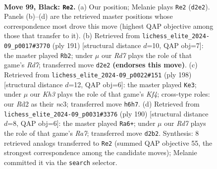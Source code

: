 \documentclass[11pt]{article}
\begin{document}
\clearpage

\begin{figure}[p]\centering
\begin{subfigure}{0.46\textwidth}\centering
\resizebox{\linewidth}{!}{%
\newchessgame
\chessboard[
  setfen={2R5/6p1/5p1k/7p/1N5P/6PK/3r4/8 b - - 23 99},
  showmover=false,
  pgfstyle=straightmove, color=movearrow, markmove={d2-e2}
]}
\caption{}
\end{subfigure}\hfill
\begin{subfigure}{0.46\textwidth}\centering
\resizebox{\linewidth}{!}{%
\newchessgame
\chessboard[
  setfen={8/R7/6pk/7p/7P/6PK/3r4/8 b - - 29 96},
  showmover=false,
  pgfstyle=straightmove, color=movearrow, markmove={d2-b2}
]}
\caption{}
\end{subfigure}
\\[4pt]
\begin{subfigure}{0.46\textwidth}\centering
\resizebox{\linewidth}{!}{%
\newchessgame
\chessboard[
  setfen={8/5k2/6p1/4P2p/3N1K1P/2n3P1/8/8 w - - 7 100},
  showmover=false,
  pgfstyle=straightmove, color=movearrow, markmove={f4-e3}
]}
\caption{}
\end{subfigure}\hfill
\begin{subfigure}{0.46\textwidth}\centering
\resizebox{\linewidth}{!}{%
\newchessgame
\chessboard[
  setfen={8/R7/5k2/4p1p1/4P1P1/5PK1/2r5/8 w - - 87 96},
  showmover=false,
  pgfstyle=straightmove, color=movearrow, markmove={a7-a6}
]}
\caption{}
\end{subfigure}
\caption{\textbf{Move 99, Black: \texttt{Re2}.} (a) Our position; Melanie plays \texttt{Re2} (\texttt{d2e2}). Panels (b)--(d) are the retrieved master positions whose correspondence most drove this move (highest QAP objective among those that transfer to it). (b) Retrieved from \texttt{lichess\_elite\_2024-09\_p0017\#3770} (ply 191) [structural distance $d$=10, QAP obj=7]: the master played \texttt{Rb2}; under $\mu$ our \emph{Rd7} plays the role of that game's \emph{Rd7}; transferred move \texttt{d2e2} \textbf{(endorses this move)}. (c) Retrieved from \texttt{lichess\_elite\_2024-09\_p0022\#151} (ply 198) [structural distance $d$=12, QAP obj=6]: the master played \texttt{Ke3}; under $\mu$ our \emph{Kh3} plays the role of that game's \emph{Kf4}; cross-type roles: our \emph{R}d2 as their \emph{n}c3; transferred move \texttt{h6h7}. (d) Retrieved from \texttt{lichess\_elite\_2024-09\_p0031\#3376} (ply 190) [structural distance $d$=8, QAP obj=6]: the master played \texttt{Ra6+}; under $\mu$ our \emph{Rd7} plays the role of that game's \emph{Ra7}; transferred move \texttt{d2b2}. Synthesis: 8 retrieved analogs transferred to \texttt{Re2} (summed QAP objective 55, the strongest correspondence among the candidate moves); Melanie committed it via the \texttt{search} selector.}
\label{fig:thought-m197}
\end{figure}
\end{document}
